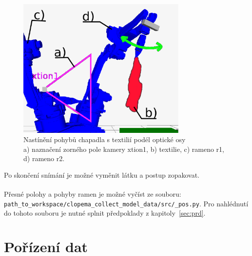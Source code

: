 \documentclass[10pt,a4paper,titlepage,oneside]{report}
\begin{document}
\begin{figure}[H]
	\centering  	
  	\includegraphics[height=7cm]{pictures/move2.eps}
  	\caption{Nastínění pohybů chapadla s textilií podél optické osy\\
  	a) naznačení zorného pole kamery xtion1, b) textilie, c) rameno r1, d) rameno r2.}
  	\label{fig:rovnoOptOsy}
\end{figure}



\noindent Po skončení snímání je možné vyměnit látku a postup zopakovat.\\
\\
Přesné polohy a pohyby ramen je možné vyčíst ze souboru:\\ \verb|path_to_workspace/clopema_collect_model_data/src/_pos.py|. Pro nahlédnutí do tohoto souboru je nutné splnit předpoklady z kapitoly~\ref{sec:prd}.


\chapter{Pořízení dat}
\end{document}
